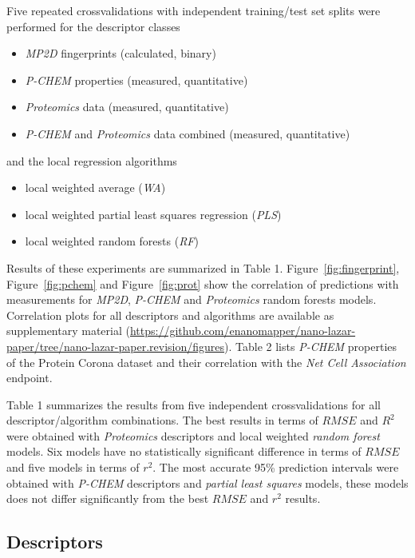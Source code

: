 \documentclass[utf8]{frontiersHLTH} %
\providecommand{\tightlist}{%
  \setlength{\itemsep}{0pt}\setlength{\parskip}{0pt}}
\begin{document}
Five repeated crossvalidations with independent training/test set splits
were performed for the descriptor classes

\begin{itemize}
\tightlist
\item
  \emph{MP2D} fingerprints (calculated, binary)
\item
  \emph{P-CHEM} properties (measured, quantitative)
\item
  \emph{Proteomics} data (measured, quantitative)
\item
  \emph{P-CHEM} and \emph{Proteomics} data combined (measured,
  quantitative)
\end{itemize}

and the local regression algorithms

\begin{itemize}
\tightlist
\item
  local weighted average (\emph{WA})
\item
  local weighted partial least squares regression (\emph{PLS})
\item
  local weighted random forests (\emph{RF})
\end{itemize}

Results of these experiments are summarized in Table 1.
Figure~\ref{fig:fingerprint}, Figure~\ref{fig:pchem} and
Figure~\ref{fig:prot} show the correlation of predictions with
measurements for \emph{MP2D}, \emph{P-CHEM} and \emph{Proteomics} random
forests models. Correlation plots for all descriptors and algorithms are
available as supplementary material
(\url{https://github.com/enanomapper/nano-lazar-paper/tree/nano-lazar-paper.revision/figures}).
Table 2 lists \emph{P-CHEM} properties of the Protein Corona dataset and
their correlation with the \emph{Net Cell Association} endpoint.

Table 1 summarizes the results from five independent crossvalidations
for all descriptor/algorithm combinations. The best results in terms of
\(RMSE\) and \(R^2\) were obtained with \emph{Proteomics} descriptors
and local weighted \emph{random forest} models. Six models have no
statistically significant difference in terms of \(RMSE\) and five
models in terms of \(r^2\). The most accurate 95\% prediction intervals
were obtained with \emph{P-CHEM} descriptors and \emph{partial least
squares} models, these models does not differ significantly from the
best \(RMSE\) and \(r^2\) results.

\subsection{Descriptors}\label{descriptors}
\end{document}
